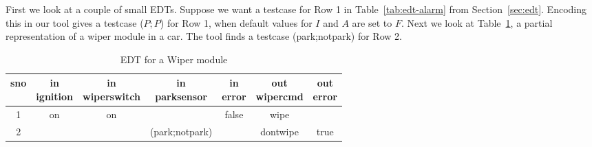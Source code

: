 First we look at a couple of small EDTs. Suppose we want a testcase for Row 1 in Table~\ref{tab:edt-alarm} from Section~\ref{sec:edt}. Encoding this in our tool gives a testcase ($P; P$) for Row 1, when default values for $I$ and $A$ are set to $F$.
%
%  
Next we look at Table~\ref{tab:wiper}, a partial representation of a wiper module in a car. The tool finds a testcase (park;notpark) for Row 2.

\begin{table}[h!]
  \centering {}
  \caption{EDT for a Wiper module}
  \label{tab:wiper}
  \begin{tabular}{|c|c|c|c|c||c|c|}
    \hline
    sno & \specialcell{in \\ ignition} &
                                         \specialcell{in \\ wiperswitch} & 
                                                                       \specialcell{in 
    \\ parksensor} & \specialcell{in \\ error} & \specialcell{out \\ wipercmd} & 
                                             \specialcell{out \\ error} \\
    \hline 
    1 & on & on & 
    & false & wipe &
    \\
    \hline

    2 & & & (park;notpark) & & dontwipe & true \\
    \hline
  \end{tabular}
  
\end{table}


